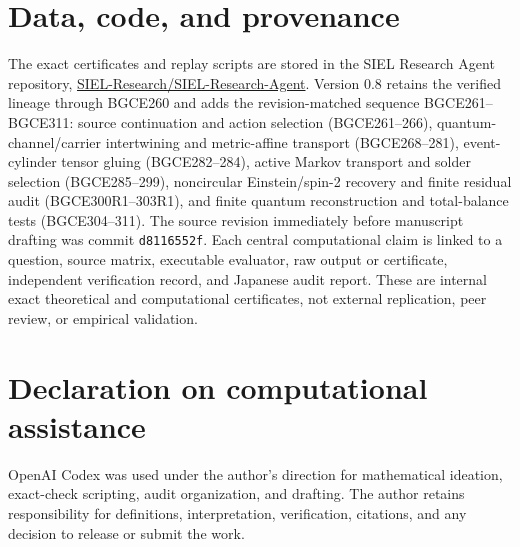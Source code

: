\documentclass[11pt]{article}
\theoremstyle{definition}
\theoremstyle{remark}
\begin{document}


\section*{Data, code, and provenance}

The exact certificates and replay scripts are stored in the SIEL Research Agent repository,
\href{https://github.com/SIEL-Research/SIEL-Research-Agent}{SIEL-Research/SIEL-Research-Agent}. Version 0.8 retains the verified lineage through BGCE260 and adds the revision-matched sequence BGCE261--BGCE311: source continuation and action selection (BGCE261--266), quantum-channel/carrier intertwining and metric-affine transport (BGCE268--281), event-cylinder tensor gluing (BGCE282--284), active Markov transport and solder selection (BGCE285--299), noncircular Einstein/spin-2 recovery and finite residual audit (BGCE300R1--303R1), and finite quantum reconstruction and total-balance tests (BGCE304--311). The source revision immediately before manuscript drafting was commit \texttt{d8116552f}. Each central computational claim is linked to a question, source matrix, executable evaluator, raw output or certificate, independent verification record, and Japanese audit report. These are internal exact theoretical and computational certificates, not external replication, peer review, or empirical validation.

\section*{Declaration on computational assistance}

OpenAI Codex was used under the author's direction for mathematical ideation, exact-check scripting, audit organization, and drafting. The author retains responsibility for definitions, interpretation, verification, citations, and any decision to release or submit the work.
\end{document}
